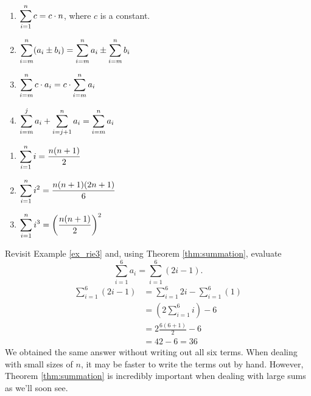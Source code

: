 \setboxwidth{75pt}
{\noindent\begin{minipage}[t]{200pt}
\begin{enumerate}
		\item		$\displaystyle \sum_{i=1}^n c = c\cdot n$, where $c$ is a constant.
		\item		$\displaystyle \sum_{i=m}^n (a_i\pm b_i) = \sum_{i=m}^n a_i \pm \sum_{i=m}^n b_i$
		\item		$\displaystyle \sum_{i=m}^n c\cdot a_i = c\cdot\sum_{i=m}^n a_i$
		\item		$\displaystyle \sum_{i=m}^j a_i + \sum_{i=j+1}^n  a_i = \sum_{i=m}^n a_i$
	\end{enumerate}
\end{minipage}
\begin{minipage}[t]{200pt}
\begin{enumerate}\addtocounter{enumi}{4}
		\item		$\displaystyle \sum_{i=1}^n i = \frac{n(n+1)}2$
		\item		$\displaystyle \sum_{i=1}^n i^2 = \frac{n(n+1)(2n+1)}6$
		\item		$\displaystyle \sum_{i=1}^n i^3 = \left(\frac{n(n+1)}2\right)^2$
	\end{enumerate}
\end{minipage}
}
\restoreboxwidth

{Revisit Example \ref{ex_rie3} and, using Theorem \ref{thm:summation}, evaluate $$\sum_{i=1}^6 a_i = \sum_{i=1}^6 (2i-1).$$
}
{\begin{align*}
		\sum_{i=1}^6 (2i-1) & = \sum_{i=1}^6 2i - \sum_{i=1}^6 (1)\\
												&=	\left(2\sum_{i=1}^6 i \right)- 6 \\
												&= 2\frac{6(6+1)}{2} - 6 \\
												&= 42-6 = 36
 \end{align*}
 We obtained the same answer without writing out all six terms. When dealing with small sizes of $n$, it may be faster to write the terms out by hand. However, Theorem \ref{thm:summation} is incredibly important when dealing with large sums as we'll soon see.
 }\\
 
